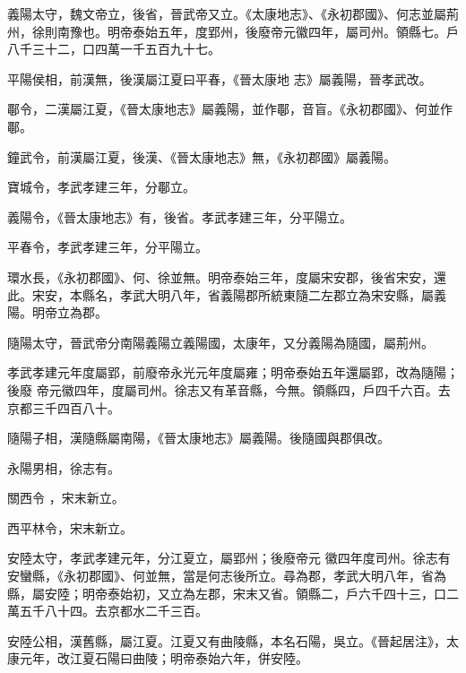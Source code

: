 \begin{pinyinscope}
 義陽太守，魏文帝立，後省，晉武帝又立。《太康地志》、《永初郡國》、何志並屬荊州，徐則南豫也。明帝泰始五年，度郢州，後廢帝元徽四年，屬司州。領縣七。戶八千三十二，口四萬一千五百九十七。



 平陽侯相，前漢無，後漢屬江夏曰平春，《晉太康地
 志》屬義陽，晉孝武改。



 鄳令，二漢屬江夏，《晉太康地志》屬義陽，並作鄳，音盲。《永初郡國》、何並作鄳。



 鐘武令，前漢屬江夏，後漢、《晉太康地志》無，《永初郡國》屬義陽。



 寶城令，孝武孝建三年，分鄳立。



 義陽令，《晉太康地志》有，後省。孝武孝建三年，分平陽立。



 平春令，孝武孝建三年，分平陽立。



 環水長，《永初郡國》、何、徐並無。明帝泰始三年，度屬宋安郡，後省宋安，還此。宋安，本縣名，孝武大明八年，省義陽郡所統東隨二左郡立為宋安縣，屬義陽。明帝立為郡。



 隨陽太守，晉武帝分南陽義陽立義陽國，太康年，又分義陽為隨國，屬荊州。



 孝武孝建元年度屬郢，前廢帝永光元年度屬雍；明帝泰始五年還屬郢，改為隨陽；後廢
 帝元徽四年，度屬司州。徐志又有革音縣，今無。領縣四，戶四千六百。去京都三千四百八十。



 隨陽子相，漢隨縣屬南陽，《晉太康地志》屬義陽。後隨國與郡俱改。



 永陽男相，徐志有。


關西令
 ，宋末新立。



 西平林令，宋末新立。



 安陸太守，孝武孝建元年，分江夏立，屬郢州；後廢帝元
 徽四年度司州。徐志有安蠻縣，《永初郡國》、何並無，當是何志後所立。尋為郡，孝武大明八年，省為縣，屬安陸；明帝泰始初，又立為左郡，宋末又省。領縣二，戶六千四十三，口二萬五千八十四。去京都水二千三百。



 安陸公相，漢舊縣，屬江夏。江夏又有曲陵縣，本名石陽，吳立。《晉起居注》，太康元年，改江夏石陽曰曲陵；明帝泰始六年，併安陸。



\end{pinyinscope}
